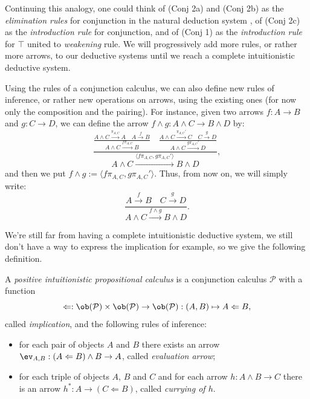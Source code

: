 Continuing this analogy, one could think of (Conj 2a) and (Conj 2b) as the \textit{elimination rules} for conjunction in the natural deduction system \cite{ChiswellHodgesAppendixA,Mennuni2025}, of (Conj 2c) as the \textit{introduction rule} for conjunction, and of
(Conj 1) as the \textit{introduction rule} for $\top$ united to \textit{weakening} rule. We will progressively add more rules, or rather more arrows, to our deductive systems until we reach a complete intuitionistic deductive system.

\begin{remark}
    Using the rules of a conjunction calculus, we can also define new rules of inference, or rather new operations on arrows, using the existing ones (for now only the composition and the pairing).
    For instance, given two arrows $f : A \to B$ and $g : C \to D$, we can define the arrow $f \wedge g : A \wedge C \to B \wedge D$ by:
    \[ \frac{\frac{A \wedge C \xrightarrow{\pi_{A,C}} A \quad A \xrightarrow{f} B}{A \wedge C \xrightarrow{f\pi_{A,C}} B} \quad \frac{A \wedge C \xrightarrow{\pi_{A,C}'} C \quad C \xrightarrow{g} D}{A \wedge C \xrightarrow{g\pi_{A,C}'} D}}{A \wedge C \xrightarrow{\langle f\pi_{A,C},g\pi_{A,C}'\rangle} B \wedge D}, \]
    and then we put $f \wedge g := \langle f\pi_{A,C},g\pi_{A,C}'\rangle$. Thus, from now on, we will simply write:
    \[ \frac{A \xrightarrow{f} B \quad C \xrightarrow{g} D}{A \wedge C \xrightarrow{f \wedge g} B \wedge D}. \]
\end{remark}

We're still far from having a complete intuitionistic deductive system, we still don't have a way to express the implication for example, so we give the following definition.

\begin{definition}
    A \textit{positive intuitionistic propositional calculus} is a conjunction calculus $\mathcal P$ with a function
    \[ \Leftarrow : \ob(\mathcal P)\times\ob(\mathcal P) \to \ob(\mathcal P) : (A,B) \mapsto A \Leftarrow B, \]
    called \textit{implication}, and the following rules of inference:
    \begin{itemize}
        \item[(\textnormal{Impl 1})] for each pair of objects $A$ and $B$ there exists an arrow $\ev_{A,B} : (A \Leftarrow B) \wedge B \to A$, called \textit{evaluation arrow};
        \item[(\textnormal{Impl 2})] for each triple of objects $A$, $B$ and $C$ and for each arrow $h : A \wedge B \to C$ there is an arrow $h^* : A \to (C \Leftarrow B)$, called \textit{currying of $h$}.
    \end{itemize}
\end{definition}

